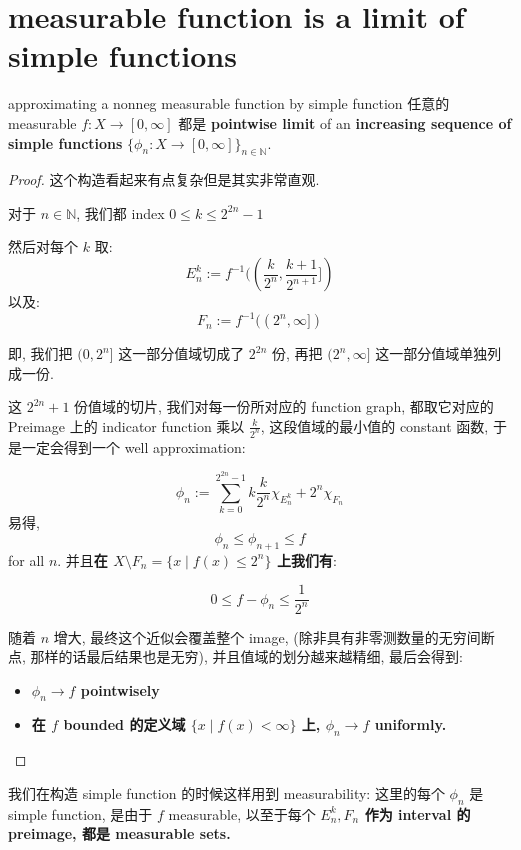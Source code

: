 \documentclass[lang=cn,11pt]{elegantbook}
\begin{document}
\section{measurable function is a limit of simple functions}
\begin{theorem}{approximating a nonneg measurable function by simple function}
\label{approximating a nonneg measurable function by simple function}
    任意的 measurable $f:X \rightarrow [0,\infty]$ 都是 \textbf{pointwise limit} of an \textbf{increasing sequence of simple functions} $\{\phi_n:X\rightarrow [0,\infty]\}_{n\in\mathbb{N}}$.
\end{theorem}
\begin{proof}
    这个构造看起来有点复杂但是其实非常直观.

    对于 $n\in \mathbb{N}$, 我们都 index $0 \leq k \leq 2^{2n}-1$

    然后对每个 $k$ 取:
    $$
    E_n^k := f^{-1}((\frac{k}{2^n},\frac{k+1}{2^{n+1}}])
    $$
    以及:
    $$
    F_n := f^{-1}((2^n,\infty])
    $$

    即, 我们把 $(0,2^n]$ 这一部分值域切成了 $2^{2n}$ 份, 再把 $(2^n,\infty]$ 这一部分值域单独列成一份.
    
    这 $2^{2n} +1$ 份值域的切片, 我们对每一份所对应的 function graph, 都取它对应的 Preimage 上的 indicator function 乘以 $\frac{k}{2^n}$, 这段值域的最小值的 constant 函数, 于是一定会得到一个 well approximation:

$$
\phi_n := \sum_{k=0}^{2^{2n}-1} k\frac{k}{2^n} \chi_{E_n^k} + 2^n \chi_{F_n}
$$
易得, $$\phi_n \leq \phi_{n+1} \leq f$$
for all $n$. 并且\textbf{在 $X \setminus F_n = \{ x\mid f(x) \leq 2^n  \}$ 上我们有}:

$$
0 \leq f-\phi_n \leq \frac{1}{2^n}
$$

    
    随着 $n$ 增大, 最终这个近似会覆盖整个 image, (除非具有非零测数量的无穷间断点, 那样的话最后结果也是无穷), 并且值域的划分越来越精细, 最后会得到: 
    \begin{itemize}
        \item \textbf{$\phi_n \rightarrow f$ pointwisely}
        \item \textbf{在 $f$ bounded 的定义域 $\{x \mid f(x) <\infty\}$ 上, $\phi_n \rightarrow f$ uniformly.}
    \end{itemize}

\end{proof}
\begin{remark}
我们在构造 simple function 的时候这样用到 measurability:
这里的每个 $\phi_n$ 是 simple function, 是由于 $f$ measurable, 以至于每个 \textbf{$E_n^k, F_n$ 作为 interval 的 preimage, 都是 measurable sets. } 
\end{remark}
\end{document}
